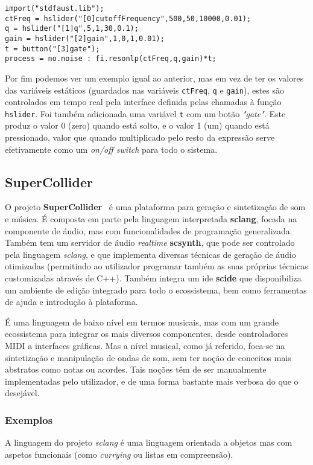 \begin{lstlisting}[caption={Geração de ruído aleatório com um filtro \textit{low-pass} controlada por uma interface}]
import("stdfaust.lib");
ctFreq = hslider("[0]cutoffFrequency",500,50,10000,0.01);
q = hslider("[1]q",5,1,30,0.1);
gain = hslider("[2]gain",1,0,1,0.01);
t = button("[3]gate");
process = no.noise : fi.resonlp(ctFreq,q,gain)*t;
\end{lstlisting}
Por fim podemos ver um exemplo igual ao anterior, mas em vez de ter os valores das variáveis estáticos (guardados nas variáveis \texttt{ctFreq}, \texttt{q} e \texttt{gain}), estes são controlados em tempo real pela interface definida pelas chamadas à função \texttt{hslider}. Foi também adicionada uma variável \texttt{t} com um botão \textit{"gate"}. Este produz o valor 0 (zero) quando está solto, e o valor 1 (um) quando está pressionado, valor que quando multiplicado pelo resto da expressão serve efetivamente como um \textit{on/off switch} para todo o sistema.

\subsection{SuperCollider}
O projeto \textbf{SuperCollider}~\cite{doi:SuperCollider, orlarey:hal-02158894} é uma plataforma para geração e sintetização de som e música. É composta em parte pela linguagem interpretada \textbf{sclang}, focada na componente de áudio, mas com funcionalidades de programação generalizada. Também tem um servidor de áudio \textit{realtime} \textbf{scsynth}, que pode ser controlado pela linguagem \textit{sclang}, e que implementa diversas técnicas de geração de áudio otimizadas (permitindo ao utilizador programar também as suas próprias técnicas customizadas através de C++). Também integra um \acrshort{ide} \textbf{scide} que disponibiliza um ambiente de edição integrado para todo o ecossistema, bem como ferramentas de ajuda e introdução à plataforma.

É uma linguagem de baixo nível em termos musicais, mas com um grande ecossistema para integrar os mais diversos componentes, desde controladores MIDI a interfaces gráficas. Mas a nível musical, como já referido, foca-se na sintetização e manipulação de ondas de som, sem ter noção de conceitos mais abstratos como notas ou acordes. Tais noções têm de ser manualmente implementadas pelo utilizador, e de uma forma bastante mais verbosa do que o desejável.

\subsubsection{Exemplos}
A linguagem do projeto \textit{sclang} é uma linguagem orientada a objetos mas com aspetos funcionais (como \textit{currying} ou listas em compreensão).


